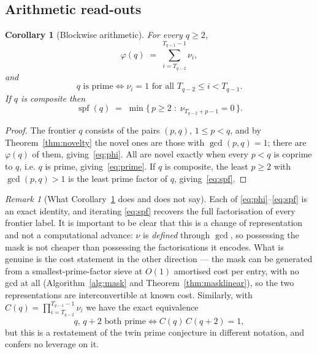 \documentclass[11pt,a4paper]{article}
\theoremstyle{plain}
\newtheorem{corollary}[theorem]{Corollary}
\theoremstyle{definition}
\theoremstyle{remark}
\newtheorem{remark}[theorem]{Remark}
\DeclareMathOperator{\spf}{spf}
\begin{document}
\subsection{Arithmetic read-outs}

\begin{corollary}[Blockwise arithmetic]\label{cor:arith}
For every $q \ge 2$,
\begin{equation}\label{eq:phi}
  \varphi(q) \;=\; \sum_{i=T_{q-2}}^{T_{q-1}-1} \nu_i,
\end{equation}
and
\begin{equation}\label{eq:prime}
  q \text{ is prime} \iff \nu_i = 1 \text{ for all } T_{q-2} \le i < T_{q-1}.
\end{equation}
If $q$ is composite then
\begin{equation}\label{eq:spf}
  \spf(q) \;=\; \min\{\,p \ge 2 \;:\; \nu_{T_{q-2}+p-1} = 0 \,\}.
\end{equation}
\end{corollary}

\begin{proof}
The frontier $q$ consists of the pairs $(p,q)$, $1 \le p < q$, and by
Theorem~\ref{thm:novelty} the novel ones are those with $\gcd(p,q) = 1$; there
are $\varphi(q)$ of them, giving~\eqref{eq:phi}. All are novel exactly when
every $p < q$ is coprime to $q$, i.e. $q$ is prime, giving~\eqref{eq:prime}. If
$q$ is composite, the least $p \ge 2$ with $\gcd(p,q) > 1$ is the least prime
factor of $q$, giving~\eqref{eq:spf}.
\end{proof}

\begin{remark}[What Corollary~\ref{cor:arith} does and does not say]
\label{rem:honest}
Each of \eqref{eq:phi}--\eqref{eq:spf} is an exact identity, and iterating
\eqref{eq:spf} recovers the full factorisation of every frontier label. It is
important to be clear that this is a change of representation and not a
computational advance: $\nu$ is \emph{defined} through $\gcd$, so possessing the
mask is not cheaper than possessing the factorisations it encodes. What is
genuine is the cost statement in the other direction --- the mask can be
generated from a smallest-prime-factor sieve at $O(1)$ amortised cost per entry,
with no gcd at all (Algorithm~\ref{alg:mask} and Theorem~\ref{thm:masklinear}),
so the two representations are interconvertible at known cost. Similarly, with
$C(q) = \prod_{i=T_{q-2}}^{T_{q-1}-1}\nu_i$ we have the exact equivalence
\[
  q,\, q+2 \text{ both prime} \iff C(q)\,C(q+2) = 1,
\]
but this is a restatement of the twin prime conjecture in different notation,
and confers no leverage on it.
\end{remark}
\end{document}
